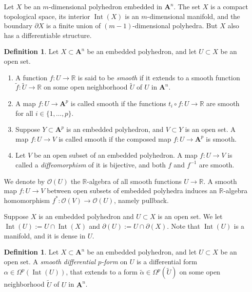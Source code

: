 \documentclass[10pt, a4paper]{amsart}
\theoremstyle{definition}
\newtheorem{dfn}[equation]{Definition}
\numberwithin{equation}{section}
\newcommand{\opn}{\operatorname}
\newcommand{\mcal}[1]{\mathcal{#1}}
\newcommand{\mbf}[1]{\mathbf{#1}}
\newcommand{\mbb}[1]{\mathbb{#1}}
\newcommand{\til}[1]{\tilde{#1}}
\newcommand{\R}{\mbb{R}}
\begin{document}
Let $X$ be an $m$-dimensional polyhedron embedded in $\mbf{A}^n$. The set $X$ is
a compact topological space, its interior $\opn{Int} (X)$ is an $m$-dimensional
manifold, and the boundary $\partial X$ is a finite union of
$(m-1)$-dimensional polyhedra. But $X$ also has a differentiable structure.

\begin{dfn} \label{dfn:500}
Let $X \subset \mbf{A}^n$ be an embedded polyhedron, and let $U \subset X$ be
an open set.
\begin{enumerate}
\item A function $f : U \to \R$ is said to be {\em smooth} if 
it extends to a smooth function $\til{f} : \til{U} \to \R$
on some open neighborhood $\til{U}$ of $U$ in $\mbf{A}^n$.

\item A map $f : U \to \mbf{A}^p$ is called smooth if the functions 
$t_i \circ f : U \to \R$ are  smooth for all $i \in \{ 1, \ldots, p \}$.

\item Suppose $Y \subset \mbf{A}^p$ is an embedded polyhedron, and 
$V \subset Y$ is an open set. A map $f : U \to V$ is called smooth if the
composed map $f : U \to \mbf{A}^p$ is smooth. 

\item Let $V$ be an open subset of an embedded polyhedron. A map $f : U \to V$
is called a {\em diffeomorphism} of it is bijective, and both $f$ and $f^{-1}$
are smooth.
\end{enumerate}
\end{dfn}

We denote by $\mcal{O}(U)$ the $\R$-algebra of all smooth functions 
$U \to \R$.
A smooth map $f : U \to V$ between open subsets of embedded polyhedra induces an
$\R$-algebra homomorphism $f^* : \mcal{O}(V) \to \mcal{O}(U)$, namely pullback. 

Suppose $X$ is an embedded polyhedron and $U \subset X$ is an open set. 
We let $\opn{Int}(U) := U \cap \opn{Int}(X)$ and 
$\partial(U) := U \cap \partial(X)$. Note that $\opn{Int}(U)$ is a
manifold, and it is dense in $U$.

\begin{dfn}  \label{dfn:501}
Let $X \subset \mbf{A}^n$ be an embedded polyhedron,
and let $U \subset X$ be an open set.
A {\em smooth differential $p$-form} on $U$ is a differential form
$\alpha \in \Omega^p(\opn{Int} (U))$, that extends to a form
$\til{\alpha} \in \Omega^p(\til{U})$ on some open neighborhood $\til{U}$ of $U$
in $\mbf{A}^n$. 
\end{dfn}
\end{document}
